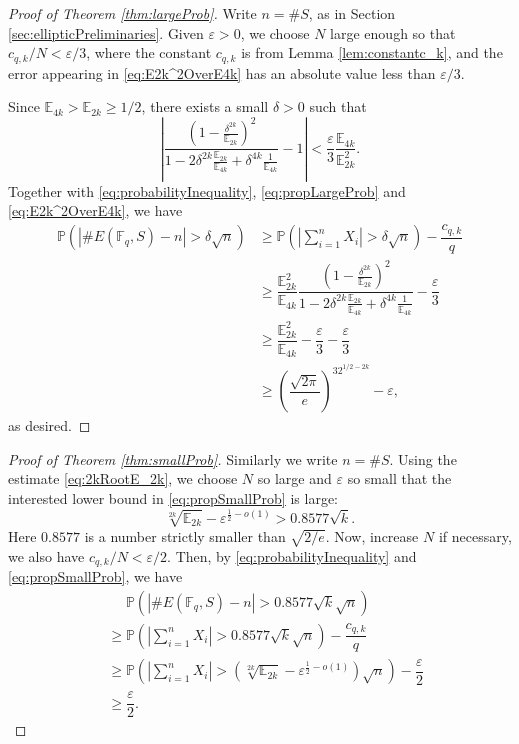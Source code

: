 \documentclass{amsart}
\theoremstyle{plain}
\theoremstyle{definition}
\newcommand{\eps}{\varepsilon}
\newcommand{\EE}{\mathbb{E}}
\newcommand{\PP}{\mathbb{P}}
\newcommand{\Fq}{\mathbb{F}_q}
\newcommand{\abs}[1]{\left|#1\right|}
\begin{document}
\begin{proof}[Proof of Theorem \ref{thm:largeProb}]
Write $n=\#S$, as in Section \ref{sec:ellipticPreliminaries}. Given $\eps>0$, we choose $N$ large enough so that $c_{q,k}/N<\eps/3$, where the constant $c_{q,k}$ is from Lemma \ref{lem:constantc_k}, and the error appearing in \eqref{eq:E2k^2OverE4k} has an absolute value less than $\eps/3$.

Since $\EE_{4k}>\EE_{2k}\geq1/2$, there exists a small $\delta>0$ such that
\[
\left|\dfrac{(1-\frac{\delta^{2k}}{\EE_{2k}})^2}{1-2\delta^{2k}\frac{\EE_{2k}}{\EE_{4k}}+\delta^{4k}\frac{1}{\EE_{4k}}}-1\right|<\dfrac{\eps}{3}\dfrac{\EE_{4k}}{\EE_{2k}^2}.
\]
Together with \eqref{eq:probabilityInequality}, \eqref{eq:propLargeProb} and \eqref{eq:E2k^2OverE4k}, we have
\[
\begin{split}
\PP(\abs{\#E(\Fq,S)-n}>\delta\sqrt{n})
&\geq\PP\left(\abs{\sum_{i=1}^nX_i}>\delta\sqrt{n}\right)-\dfrac{c_{q,k}}{q}\\
&\geq\dfrac{\EE_{2k}^2}{\EE_{4k}}\dfrac{(1-\frac{\delta^{2k}}{\EE_{2k}})^2}{1-2\delta^{2k}\frac{\EE_{2k}}{\EE_{4k}}+\delta^{4k}\frac{1}{\EE_{4k}}}-\dfrac{\eps}{3}\\
&\geq\dfrac{\EE_{2k}^2}{\EE_{4k}}-\dfrac{\eps}{3}-\dfrac{\eps}{3}\\
&\geq\left(\dfrac{\sqrt{2\pi}}{e}\right)^32^{1/2-2k}-\eps,
\end{split}
\]
as desired.
\end{proof}

\begin{proof}[Proof of Theorem \ref{thm:smallProb}]
Similarly we write $n=\#S$. Using the estimate \eqref{eq:2kRootE_2k}, we choose $N$ so large and $\eps$ so small that the interested lower bound in \eqref{eq:propSmallProb} is large:
\[
\sqrt[2k]{\EE_{2k}}-\eps^{\frac12-o(1)}>0.8577\sqrt{k}.
\]
Here $0.8577$ is a number strictly smaller than $\sqrt{2/e}$. Now, increase $N$ if necessary, we also have $c_{q,k}/N<\eps/2$. Then, by \eqref{eq:probabilityInequality} and \eqref{eq:propSmallProb}, we have
\[
\begin{split}
&\quad\,\,\PP(\abs{\#E(\Fq,S)-n}>0.8577\sqrt{k}\sqrt{n})\\
&\geq\PP\left(\abs{\sum_{i=1}^nX_i}>0.8577\sqrt{k}\sqrt{n}\right)-\dfrac{c_{q,k}}{q}\\
&\geq\PP\left(\abs{\sum_{i=1}^nX_i}>\left(\sqrt[2k]{\EE_{2k}}-\eps^{\frac12-o(1)}\right)\sqrt{n}\right)-\dfrac{\eps}{2}\\
&\geq\dfrac{\eps}{2}.
\end{split}
\]
\end{proof}
\end{document}
